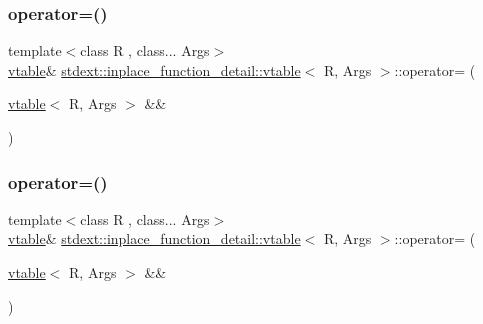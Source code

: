 \mbox{\label{structstdext_1_1inplace__function__detail_1_1vtable_a92d71778c1520b8441d9cd2a313904a0}} 
\subsubsection{\texorpdfstring{operator=()}{operator=()}\hspace{0.1cm}{\footnotesize\ttfamily [3/4]}}
{\footnotesize\ttfamily template$<$class R , class... Args$>$ \\
\hyperlink{structstdext_1_1inplace__function__detail_1_1vtable}{vtable}\& \hyperlink{structstdext_1_1inplace__function__detail_1_1vtable}{stdext\+::inplace\+\_\+function\+\_\+detail\+::vtable}$<$ R, Args $>$\+::operator= (\begin{DoxyParamCaption}\item[{\hyperlink{structstdext_1_1inplace__function__detail_1_1vtable}{vtable}$<$ R, Args $>$ \&\&}]{ }\end{DoxyParamCaption})\hspace{0.3cm}{\ttfamily [delete]}}

\mbox{\label{structstdext_1_1inplace__function__detail_1_1vtable_a92d71778c1520b8441d9cd2a313904a0}} 
\subsubsection{\texorpdfstring{operator=()}{operator=()}\hspace{0.1cm}{\footnotesize\ttfamily [4/4]}}
{\footnotesize\ttfamily template$<$class R , class... Args$>$ \\
\hyperlink{structstdext_1_1inplace__function__detail_1_1vtable}{vtable}\& \hyperlink{structstdext_1_1inplace__function__detail_1_1vtable}{stdext\+::inplace\+\_\+function\+\_\+detail\+::vtable}$<$ R, Args $>$\+::operator= (\begin{DoxyParamCaption}\item[{\hyperlink{structstdext_1_1inplace__function__detail_1_1vtable}{vtable}$<$ R, Args $>$ \&\&}]{ }\end{DoxyParamCaption})\hspace{0.3cm}{\ttfamily [delete]}}



